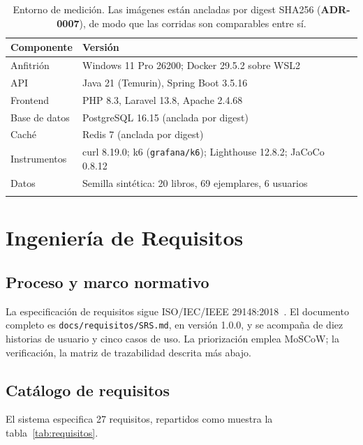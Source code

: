 \documentclass[11pt,a4paper]{article}
\newcommand{\adr}[1]{\textbf{ADR-#1}}
\begin{document}
\begin{longtable}{@{}p{4cm}p{10.5cm}@{}}
\toprule
\textbf{Componente} & \textbf{Versión} \\
\midrule
\endhead
Anfitrión & Windows 11 Pro 26200; Docker 29.5.2 sobre WSL2 \\
API & Java 21 (Temurin), Spring Boot 3.5.16 \\
Frontend & PHP 8.3, Laravel 13.8, Apache 2.4.68 \\
Base de datos & PostgreSQL 16.15 (anclada por digest) \\
Caché & Redis 7 (anclada por digest) \\
Instrumentos & curl 8.19.0; k6 (\texttt{grafana/k6}); Lighthouse 12.8.2; JaCoCo 0.8.12 \\
Datos & Semilla sintética: 20 libros, 69 ejemplares, 6 usuarios \\
\bottomrule
\caption{Entorno de medición. Las imágenes están ancladas por digest SHA256
(\adr{0007}), de modo que las corridas son comparables entre sí.}
\end{longtable}

\section{Ingeniería de Requisitos}\label{sec:requisitos}

\subsection{Proceso y marco normativo}

La especificación de requisitos sigue ISO/IEC/IEEE 29148:2018~\cite{iso29148}.
El documento completo es \texttt{docs\-/requisitos\-/SRS.md}, en versión 1.0.0,
y se acompaña de diez historias de usuario y cinco casos de uso. La priorización
emplea MoSCoW; la verificación, la matriz de trazabilidad descrita más abajo.

\subsection{Catálogo de requisitos}

El sistema especifica 27 requisitos, repartidos como muestra la
tabla~\ref{tab:requisitos}.
\end{document}

